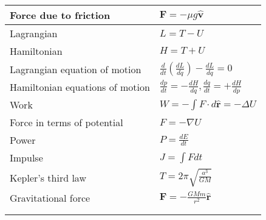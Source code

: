 \documentclass[11pt]{paper}
\begin{document}
\begin{longtable}{ll}
\multicolumn{1}{|l|}{Force due to friction} & \multicolumn{1}{l|}{$\mathbf{F} = -\mu g \mathbf{\hat{v}}$} \\ \hline
\multicolumn{1}{|l|}{Lagrangian} & \multicolumn{1}{l|}{$L = T-U$} \\ \hline
\multicolumn{1}{|l|}{Hamiltonian} & \multicolumn{1}{l|}{$H = T+U$} \\ \hline
\multicolumn{1}{|l|}{Lagrangian equation of motion} & \multicolumn{1}{l|}{$\frac{d}{dt}\left(\frac{dL}{d\dot{q}}\right)-\frac{dL}{dq} = 0$} \\ \hline
\multicolumn{1}{|l|}{Hamiltonian equations of motion} & \multicolumn{1}{l|}{$\frac{dp}{dt} = -\frac{dH}{dq}, \frac{dq}{dt} = +\frac{dH}{dp}$} \\ \hline
\multicolumn{1}{|l|}{Work} & \multicolumn{1}{l|}{$W = -\int F \cdot d\mathbf{\hat{r}} = -\Delta U$} \\ \hline
\multicolumn{1}{|l|}{Force in terms of potential} & \multicolumn{1}{l|}{$F = -\nabla U$} \\ \hline
\multicolumn{1}{|l|}{Power} & \multicolumn{1}{l|}{$P = \frac{dE}{dt}$} \\ \hline
\multicolumn{1}{|l|}{Impulse} & \multicolumn{1}{l|}{$J = \int F dt$} \\ \hline
\multicolumn{1}{|l|}{Kepler's third law} & \multicolumn{1}{l|}{$T = 2\pi\sqrt{\frac{a^3}{GM}}$} \\ \hline
\multicolumn{1}{|l|}{Gravitational force} & \multicolumn{1}{l|}{$\mathbf{F} = -\frac{GMm}{r^2}\mathbf{\hat{r}}$} \\ \hline\\\\
\end{longtable}
\egroup


\newpage
\end{document}
